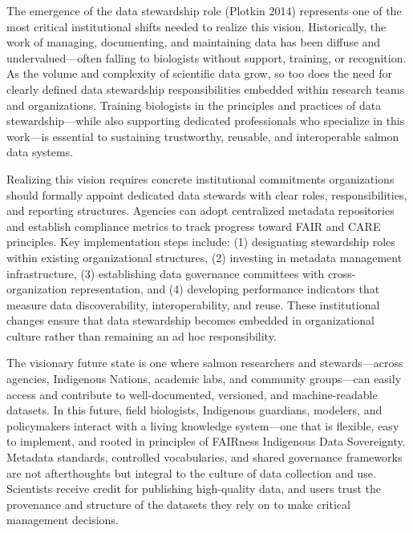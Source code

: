 \documentclass[
  letterpaper,
  DIV=11,
  numbers=noendperiod]{scrartcl}
\begin{document}
The emergence of the data stewardship role (Plotkin 2014) represents one
of the most critical institutional shifts needed to realize this vision.
Historically, the work of managing, documenting, and maintaining data
has been diffuse and undervalued---often falling to biologists without
support, training, or recognition. As the volume and complexity of
scientific data grow, so too does the need for clearly defined data
stewardship responsibilities embedded within research teams and
organizations. Training biologists in the principles and practices of
data stewardship---while also supporting dedicated professionals who
specialize in this work---is essential to sustaining trustworthy,
reusable, and interoperable salmon data systems.

Realizing this vision requires concrete institutional commitments
organizations should formally appoint dedicated data stewards with clear
roles, responsibilities, and reporting structures. Agencies can adopt
centralized metadata repositories and establish compliance metrics to
track progress toward FAIR and CARE principles. Key implementation steps
include: (1) designating stewardship roles within existing
organizational structures, (2) investing in metadata management
infrastructure, (3) establishing data governance committees with
cross-organization representation, and (4) developing performance
indicators that measure data discoverability, interoperability, and
reuse. These institutional changes ensure that data stewardship becomes
embedded in organizational culture rather than remaining an ad hoc
responsibility.

The visionary future state is one where salmon researchers and
stewards---across agencies, Indigenous Nations, academic labs, and
community groups---can easily access and contribute to well-documented,
versioned, and machine-readable datasets. In this future, field
biologists, Indigenous guardians, modelers, and policymakers interact
with a living knowledge system---one that is flexible, easy to
implement, and rooted in principles of FAIRness Indigenous Data
Sovereignty. Metadata standards, controlled vocabularies, and shared
governance frameworks are not afterthoughts but integral to the culture
of data collection and use. Scientists receive credit for publishing
high-quality data, and users trust the provenance and structure of the
datasets they rely on to make critical management decisions.
\end{document}
